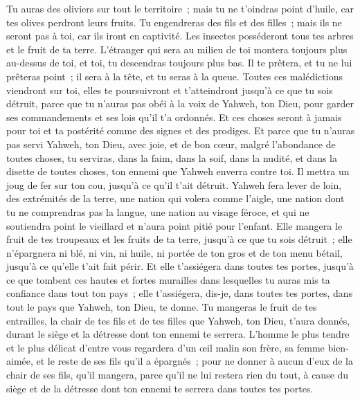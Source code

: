 \begin{multicols}{2}
Tu auras des oliviers sur tout le territoire~; mais tu ne t'oindras point d'huile, car tes olives perdront leurs fruits.
Tu engendreras des fils et des filles~; mais ils ne seront pas à toi, car ils iront en captivité.
Les insectes posséderont tous tes arbres et le fruit de ta terre.
L'étranger qui sera au milieu de toi montera toujours plus au-dessus de toi, et toi, tu descendras toujours plus bas.
Il te prêtera, et tu ne lui prêteras point~; il sera à la tête, et tu seras à la queue.
Toutes ces malédictions viendront sur toi, elles te poursuivront et t'atteindront jusqu'à ce que tu sois détruit, parce que tu n'auras pas obéi à la voix de Yahweh, ton Dieu, pour garder ses commandements et ses lois qu'il t'a ordonnés.
Et ces choses seront à jamais pour toi et ta postérité comme des signes et des prodiges.
Et parce que tu n'auras pas servi Yahweh, ton Dieu, avec joie, et de bon cœur, malgré l'abondance de toutes choses,
tu serviras, dans la faim, dans la soif, dans la nudité, et dans la disette de toutes choses, ton ennemi que Yahweh enverra contre toi. Il mettra un joug de fer sur ton cou, jusqu'à ce qu'il t'ait détruit.
Yahweh fera lever de loin, des extrémités de la terre, une nation qui volera comme l'aigle, une nation dont tu ne comprendras pas la langue,
une nation au visage féroce, et qui ne soutiendra point le vieillard et n'aura point pitié pour l'enfant.
Elle mangera le fruit de tes troupeaux et les fruits de ta terre, jusqu'à ce que tu sois détruit~; elle n'épargnera ni blé, ni vin, ni huile, ni portée de ton gros et de ton menu bétail, jusqu'à ce qu'elle t'ait fait périr.
Et elle t'assiégera dans toutes tes portes, jusqu'à ce que tombent ces hautes et fortes murailles dans lesquelles tu auras mis ta confiance dans tout ton pays~; elle t'assiégera, dis-je, dans toutes tes portes, dans tout le pays que Yahweh, ton Dieu, te donne.
Tu mangeras le fruit de tes entrailles, la chair de tes fils et de tes filles que Yahweh, ton Dieu, t'aura donnés, durant le siège et la détresse dont ton ennemi te serrera.
L'homme le plus tendre et le plus délicat d'entre vous regardera d'un œil malin son frère, sa femme bien-aimée, et le reste de ses fils qu'il a épargnés~;
pour ne donner à aucun d'eux de la chair de ses fils, qu'il mangera, parce qu'il ne lui restera rien du tout, à cause du siège et de la détresse dont ton ennemi te serrera dans toutes tes portes.

\end{multicols}
